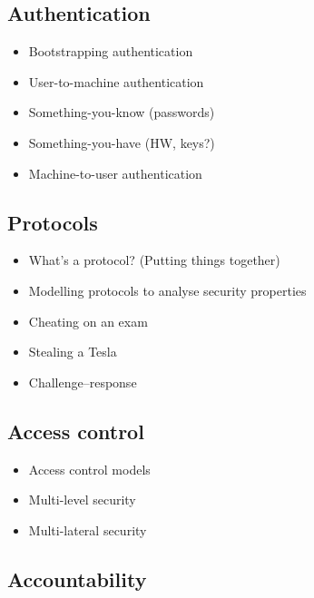 \subsection{Authentication}

\begin{frame}
  \begin{itemize}
    \item Bootstrapping authentication
    \item User-to-machine authentication
    \item Something-you-know (passwords)
    \item Something-you-have (HW, keys?)
    \item Machine-to-user authentication
  \end{itemize}
\end{frame}

\subsection{Protocols}

\begin{frame}
  \begin{itemize}
    \item What's a protocol? (Putting things together)
    \item Modelling protocols to analyse security properties
    \item Cheating on an exam
    \item Stealing a Tesla
    \item Challenge--response
  \end{itemize}
\end{frame}

\subsection{Access control}

\begin{frame}
  \begin{itemize}
    \item Access control models
    \item Multi-level security
    \item Multi-lateral security
  \end{itemize}
\end{frame}

\subsection{Accountability}

